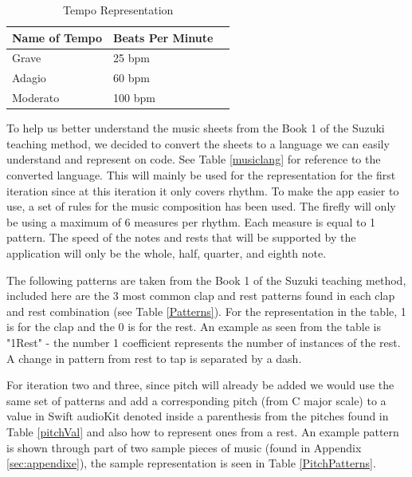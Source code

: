 \begin{table}[H]
\caption{Tempo Representation}
\label{pitchRep}
\centering
\begin{tabular}{|l|l|r|} 
\hline
Name of Tempo & Beats Per Minute   \\ 
\hline
Grave                  & 25 bpm                     \\ 
\hline
Adagio                  & 60 bpm                      \\
\hline
Moderato                   & 100 bpm                       \\ 
\hline
\end{tabular}
\end{table}

To help us better understand the music sheets from the Book 1 of the Suzuki teaching method, we decided to convert the sheets to a language we can easily understand and represent on code. See Table \ref{musiclang} for reference to the converted language. This will mainly be used for the representation for the first iteration since at this iteration it only covers rhythm. To make the app easier to use, a set of rules for the music composition has been used. The firefly will only be using a maximum of 6 measures per rhythm. Each measure is equal to 1 pattern. The speed of the notes and rests that will be supported by the application will only be the whole, half, quarter, and eighth note.

The following patterns are taken from the Book 1 of the Suzuki teaching method, included here are the 3 most common clap and rest patterns found in each clap and rest combination (see Table \ref{Patterns}). For the representation in the table, 1 is for the clap and the 0 is for the rest. An example as seen from the table is "1Rest" - the number 1 coefficient represents the number of instances of the rest. A change in pattern from rest to tap is separated by a dash. 

For iteration two and three, since pitch will already be added we would use the same set of patterns and add a corresponding pitch (from C major scale) to a value in Swift audioKit denoted inside a parenthesis from the pitches found in Table \ref{pitchVal} and also how to represent ones from a rest. An example pattern is shown through part of two sample pieces of music (found in Appendix \ref{sec:appendixe}), the sample representation is seen in Table \ref{PitchPatterns}.

